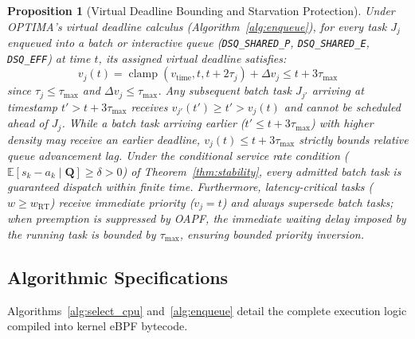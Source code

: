 \documentclass[conference]{IEEEtran}
\newtheorem{proposition}{Proposition}
\begin{document}
\begin{proposition}[Virtual Deadline Bounding and Starvation Protection]
\label{prop:starvation}
Under OPTIMA's virtual deadline calculus (Algorithm~\ref{alg:enqueue}), for every task $J_j$ enqueued into a batch or interactive queue (\texttt{DSQ\_SHARED\_P}, \texttt{DSQ\_SHARED\_E}, \texttt{DSQ\_EFF}) at time $t$, its assigned virtual deadline satisfies:
\begin{equation}
v_j(t) = \operatorname{clamp}(v_{\mathrm{time}}, t, t + 2\tau_j) + \Delta v_j \le t + 3\tau_{\max}
\end{equation}
since $\tau_j \le \tau_{\max}$ and $\Delta v_j \le \tau_{\max}$. Any subsequent batch task $J_{j'}$ arriving at timestamp $t' > t + 3\tau_{\max}$ receives $v_{j'}(t') \ge t' > v_j(t)$ and cannot be scheduled ahead of $J_j$. While a batch task arriving earlier ($t' \le t + 3\tau_{\max}$) with higher density may receive an earlier deadline, $v_j(t) \le t + 3\tau_{\max}$ strictly bounds relative queue advancement lag. Under the conditional service rate condition ($\mathbb{E}[s_k - a_k \mid \mathbf{Q}] \ge \delta > 0$) of Theorem~\ref{thm:stability}, every admitted batch task is guaranteed dispatch within finite time. Furthermore, latency-critical tasks ($w \ge w_{\mathrm{RT}}$) receive immediate priority ($v_j = t$) and always supersede batch tasks; when preemption is suppressed by OAPF, the immediate waiting delay imposed by the running task is bounded by $\tau_{\max}$, ensuring bounded priority inversion.
\end{proposition}

\subsection{Algorithmic Specifications}
Algorithms~\ref{alg:select_cpu} and~\ref{alg:enqueue} detail the complete execution logic compiled into kernel eBPF bytecode.
\end{document}

